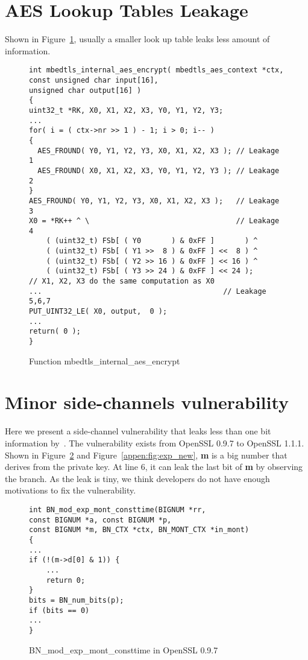 \section{AES Lookup Tables Leakage}
\label{appendix:mbedtls_aes}
Shown in Figure~\ref{fig:lookuptable}, usually a smaller look up table 
leaks less amount of information.
\begin{figure}[h]
    \centering
    \begin{lstlisting}[xleftmargin=.01\textwidth,xrightmargin=.01\textwidth]
int mbedtls_internal_aes_encrypt( mbedtls_aes_context *ctx,
const unsigned char input[16],
unsigned char output[16] )
{
uint32_t *RK, X0, X1, X2, X3, Y0, Y1, Y2, Y3;
...
for( i = ( ctx->nr >> 1 ) - 1; i > 0; i-- )
{
  AES_FROUND( Y0, Y1, Y2, Y3, X0, X1, X2, X3 ); // Leakage 1
  AES_FROUND( X0, X1, X2, X3, Y0, Y1, Y2, Y3 ); // Leakage 2
}
AES_FROUND( Y0, Y1, Y2, Y3, X0, X1, X2, X3 );   // Leakage 3
X0 = *RK++ ^ \                                  // Leakage 4
    ( (uint32_t) FSb[ ( Y0       ) & 0xFF ]       ) ^
    ( (uint32_t) FSb[ ( Y1 >>  8 ) & 0xFF ] <<  8 ) ^
    ( (uint32_t) FSb[ ( Y2 >> 16 ) & 0xFF ] << 16 ) ^
    ( (uint32_t) FSb[ ( Y3 >> 24 ) & 0xFF ] << 24 );
// X1, X2, X3 do the same computation as X0
...                                          // Leakage 5,6,7
PUT_UINT32_LE( X0, output,  0 );
...
return( 0 );
}
\end{lstlisting}
    \vspace*{-6pt}
    \caption{Function \textsf{mbedtls\_internal\_aes\_encrypt}}
    \label{fig:lookuptable}
    \vspace*{-9pt}
\end{figure}


\section{Minor side-channels vulnerability}
\label{appendix:minor:vul}
Here we present a side-channel vulnerability that leaks
less than one bit information by~\tool{}. The vulnerability exists
from OpenSSL 0.9.7 to OpenSSL 1.1.1. Shown in Figure~\ref{appen:fig:exp} 
and Figure~\ref{appen:fig:exp_new}, \textbf{m} is a big number that
derives from the private key.
At line 6, it can leak the last bit of \textbf{m} by observing the branch. 
As the leak is tiny,
we think developers do not have enough motivations
to fix the vulnerability.

\begin{figure}[h]
\centering
\begin{lstlisting}[xleftmargin=.02\textwidth,xrightmargin=.01\textwidth]
int BN_mod_exp_mont_consttime(BIGNUM *rr, 
const BIGNUM *a, const BIGNUM *p,
const BIGNUM *m, BN_CTX *ctx, BN_MONT_CTX *in_mont)
{
... 
if (!(m->d[0] & 1)) {
    ... 
    return 0;
}
bits = BN_num_bits(p);
if (bits == 0) 
...
}
\end{lstlisting}
    \vspace*{-6pt}
    \caption{\textsf{BN\_mod\_exp\_mont\_consttime} in OpenSSL 0.9.7}
    \label{appen:fig:exp}
    \vspace*{-6pt}
\end{figure}

